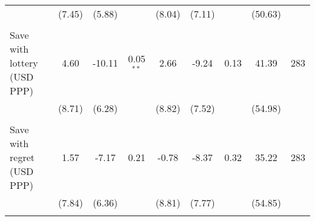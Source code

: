 \begin{table}[h]
{\begin{threeparttable}
\begin{tabular}{l*{8}{c}}
          &   (7.45)&   (5.88)&         &   (8.04)&   (7.11)&         &  (50.63)&         \\
          &         &         &         &         &         &         &         &         \\
Save with lottery (USD PPP)&     4.60&   -10.11&0.05$^{**}$&     2.66&    -9.24&     0.13&    41.39&      283\\
          &   (8.71)&   (6.28)&         &   (8.82)&   (7.52)&         &  (54.98)&         \\
          &         &         &         &         &         &         &         &         \\
Save with regret (USD PPP)&     1.57&    -7.17&     0.21&    -0.78&    -8.37&     0.32&    35.22&      283\\
          &   (7.84)&   (6.36)&         &   (8.81)&   (7.77)&         &  (54.85)&         \\
          &         &         &         &         &         &         &         &         \\
\bottomrule \end{tabular} \begin{tablenotes}[flushleft] \footnotesize \item  \end{tablenotes} \end{threeparttable} } \end{table}

